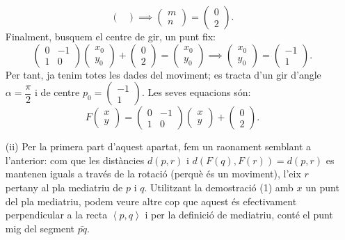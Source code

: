 \documentclass[10pt]{article}
\newcommand{\scal}[2]{\left<#1,#2\right>}
\begin{document}
\begin{itemize}
\[\begin{pmatrix}
        \end{pmatrix}\implies\begin{pmatrix}m\\ n
        \end{pmatrix}=\begin{pmatrix}0\\ 2
        \end{pmatrix}.
    \]
    Finalment, busquem el centre de gir, un punt fix:
    \[
    \begin{pmatrix}
    0 & -1\\
    1 & 0
    \end{pmatrix}\begin{pmatrix}x_0\\ y_0
    \end{pmatrix}+\begin{pmatrix}0\\ 2
    \end{pmatrix}=\begin{pmatrix}x_0\\ y_0
    \end{pmatrix}\implies\begin{pmatrix}x_0\\ y_0
    \end{pmatrix}=\begin{pmatrix}-1\\ 1
    \end{pmatrix}.
    \]
    Per tant, ja tenim totes les dades del moviment; es tracta d'un gir d'angle $\alpha=\dfrac{\pi}{2}$ i de centre $p_0=\begin{pmatrix}-1\\ 1\end{pmatrix}$. Les seves equacions són:
    \[
    F\begin{pmatrix}x\\ y\end{pmatrix}=\begin{pmatrix}
    0 & -1\\
    1 & 0
    \end{pmatrix}\begin{pmatrix}x\\ y
    \end{pmatrix}+\begin{pmatrix}0\\ 2
    \end{pmatrix}.
    \]
\item[(ii)] Per la primera part d'aquest apartat, fem un raonament semblant a l'anterior: com que les distàncies $d(p,r)$ i $d(F(q),F(r))=d(p,r)$ es mantenen iguals a través de la rotació (perquè és un moviment), l'eix $r$ pertany al pla mediatriu de $p$ i $q$. Utilitzant la demostració (1) amb $x$ un punt del pla mediatriu, podem veure altre cop que aquest és efectivament perpendicular a la recta $\scal{p}{q}$ i per la definició de mediatriu, conté el punt mig del segment $\bar{pq}$.\\

\end{itemize}
\end{document}

